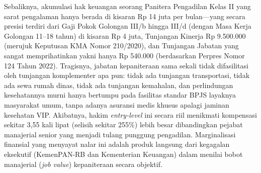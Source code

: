 \documentclass[12pt, a4paper]{article}
\begin{document}
Sebaliknya, akumulasi hak keuangan seorang Panitera Pengadilan Kelas II yang sarat pengalaman hanya berada di kisaran Rp 14 juta per bulan---yang secara presisi terdiri dari Gaji Pokok Golongan III/b hingga III/d (dengan Masa Kerja Golongan 11--18 tahun) di kisaran Rp 4 juta, Tunjangan Kinerja Rp 9.500.000 (merujuk Keputusan KMA Nomor 210/2020), dan Tunjangan Jabatan yang sangat memprihatinkan yakni hanya Rp 540.000 (berdasarkan Perpres Nomor 124 Tahun 2022). Tragisnya, jabatan kepaniteraan sama sekali tidak difasilitasi oleh tunjangan komplementer apa pun: tidak ada tunjangan transportasi, tidak ada sewa rumah dinas, tidak ada tunjangan kemahalan, dan perlindungan kesehatannya murni hanya bertumpu pada fasilitas standar BPJS layaknya masyarakat umum, tanpa adanya asuransi medis khusus apalagi jaminan kesehatan VIP. Akibatnya, hakim \textit{entry-level} ini secara riil menikmati kompensasi sekitar 3,55 kali lipat (selisih sekitar 255\%) lebih besar dibandingkan pejabat manajerial senior yang menjadi tulang punggung pengadilan. Marginalisasi finansial yang menyayat nalar ini adalah produk langsung dari kegagalan eksekutif (KemenPAN-RB dan Kementerian Keuangan) dalam menilai bobot manajerial (\textit{job value}) kepaniteraan secara objektif.
\end{document}
